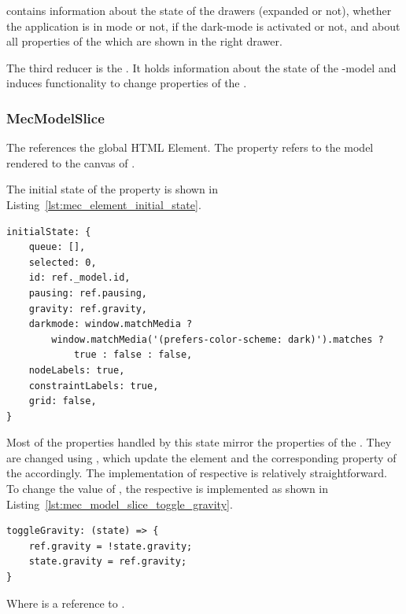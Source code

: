  contains information about the state of the drawers (expanded or not), whether the application is in  mode or not, if the dark-mode is activated or not, and about all properties of the  which are shown in the right drawer.

The third reducer is the .
It holds information about the state of the -model and induces functionality to change properties of the .

\subsubsection{MecModelSlice}

The  references the global  HTML Element.
The  property refers to the  model rendered to the canvas of .

The initial state of the  property is shown in Listing~\ref{lst:mec_element_initial_state}.

\begin{lstlisting}[label={lst:mec_element_initial_state}, caption={\code{initialState} property of \code{MecModel}.}]
initialState: {
    queue: [],
    selected: 0,
    id: ref._model.id,
    pausing: ref.pausing,
    gravity: ref.gravity,
    darkmode: window.matchMedia ?
        window.matchMedia('(prefers-color-scheme: dark)').matches ?
            true : false : false,
    nodeLabels: true,
    constraintLabels: true,
    grid: false,
}
\end{lstlisting}

Most of the properties handled by this state mirror the properties of the .
They are changed using , which update the element and the corresponding property of the  accordingly.
The implementation of respective  is relatively straightforward.
To change the value of , the respective   is implemented as shown in Listing~\ref{lst:mec_model_slice_toggle_gravity}.

\begin{lstlisting}[label={lst:mec_model_slice_toggle_gravity}, caption={\code{toggleGravity} property in \code{MecModel}s \code{reducer}}]
toggleGravity: (state) => {
    ref.gravity = !state.gravity;
    state.gravity = ref.gravity;
}
\end{lstlisting}

Where  is a reference to .


